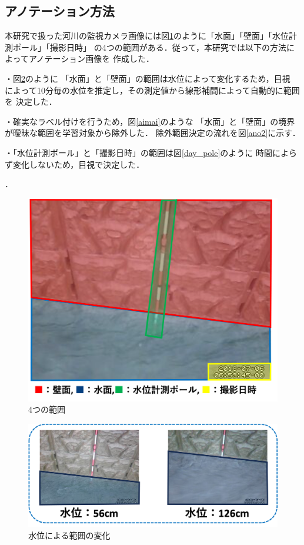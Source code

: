 \subsection{アノテーション方法}
\label{4.2}
本研究で扱った河川の監視カメラ画像には図\ref{image_area}のように「水面」「壁面」「水位計測ポール」「撮影日時」
の4つの範囲がある．従って，本研究では以下の方法によってアノテーション画像を
作成した．
\begin{description}
  \item・図\ref{area}のように
  「水面」と「壁面」の範囲は水位によって変化するため，目視
  によって10分毎の水位を推定し，その測定値から線形補間によって自動的に範囲を
  決定した．
  \vspace{-3mm}
  \item・確実なラベル付けを行うため，図\ref{aimai}のような
  「水面」と「壁面」の境界が曖昧な範囲を学習対象から除外した．
  除外範囲決定の流れを図\ref{ano2}に示す．
  \vspace{-3mm}
  \item・「水位計測ポール」と「撮影日時」の範囲は図\ref{day_pole}のように
  時間によらず変化しないため，目視で決定した．
\end{description}．

\begin{figure}[ht]
  \centering
  \includegraphics[keepaspectratio,width=0.8\linewidth]{image/image_area.png}
  \caption{4つの範囲}
  \label{image_area}
\end{figure}

\begin{figure}[ht]
  \centering
  \includegraphics[keepaspectratio,width=0.9\linewidth]{image/water_level.png}
  \caption{水位による範囲の変化}
  \label{area}
\end{figure}

